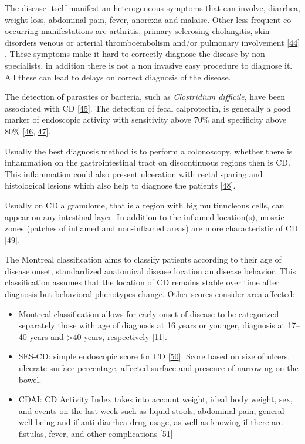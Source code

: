 \documentclass[
  12pt,
  a4paper,
  twoside,
  openright]{book}
\providecommand{\tightlist}{%
  \setlength{\itemsep}{0pt}\setlength{\parskip}{0pt}}
\begin{document}
The disease itself manifest an heterogeneous symptoms that can involve, diarrhea, weight loss, abdominal pain, fever, anorexia and malaise.
Other less frequent co-occurring manifestations are arthritis, primary sclerosing cholangitis, skin disorders venous or arterial thromboembolism and/or pulmonary involvement {[}\protect\hyperlink{ref-baumgart2012}{44}{]} .
These symptoms make it hard to correctly diagnose the disease by non-specialists, in addition there is not a non invasive easy procedure to diagnose it.
All these can lead to delays on correct diagnosis of the disease.

The detection of parasites or bacteria, such as \emph{Clostridium difficile}, have been associated with CD {[}\protect\hyperlink{ref-khanna2017}{45}{]}.
The detection of fecal calprotectin, is generally a good marker of endoscopic activity with sensitivity above 70\% and specificity above 80\% {[}\protect\hyperlink{ref-guardiola2018}{46}, \protect\hyperlink{ref-sands2015}{47}{]}.

Usually the best diagnosis method is to perform a colonoscopy, whether there is inflammation on the gastrointestinal tract on discontinuous regions then is CD.
This inflammation could also present ulceration with rectal sparing and histological lesions which also help to diagnose the patients {[}\protect\hyperlink{ref-corralizamuxe1rquez2019}{48}{]}.

Usually on CD a granulome, that is a region with big multinucleous cells, can appear on any intestinal layer.
In addition to the inflamed location(s), mosaic zones (patches of inflamed and non-inflamed areas) are more characteristic of CD {[}\protect\hyperlink{ref-bassolasmolina2018}{49}{]}.

The Montreal classification aims to classify patients according to their age of disease onset, standardized anatomical disease location an disease behavior.
This classification assumes that the location of CD remains stable over time after diagnosis but behavioral phenotypes change.
Other scores consider area affected:

\begin{itemize}
\tightlist
\item
  Montreal classification allows for early onset of disease to be categorized separately those with age of diagnosis at 16 years or younger, diagnosis at 17--40 years and \textgreater40 years, respectively {[}\protect\hyperlink{ref-satsangi2006}{11}{]}.
\item
  SES-CD: simple endoscopic score for CD {[}\protect\hyperlink{ref-daperno2004}{50}{]}. Score based on size of ulcers, ulcerate surface percentage, affected surface and presence of narrowing on the bowel.
\item
  CDAI: CD Activity Index takes into account weight, ideal body weight, sex, and events on the last week such as liquid stools, abdominal pain, general well-being and if anti-diarrhea drug usage, as well as knowing if there are fistulas, fever, and other complications {[}\protect\hyperlink{ref-best1976}{51}{]}
\end{itemize}
\end{document}
